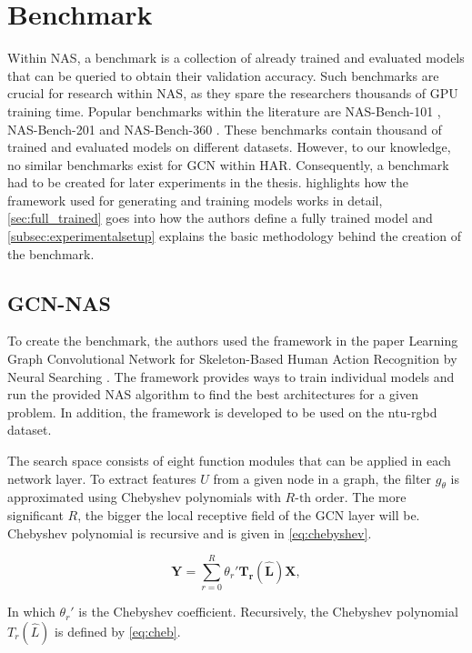 \section{Benchmark}
Within \gls{NAS}, a benchmark is a collection of already trained and evaluated models that can be queried to obtain their validation accuracy. Such benchmarks are crucial for research within \gls{NAS}, as they spare the researchers thousands of \gls{GPU} training time. Popular benchmarks within the literature are NAS-Bench-101 \autocite{ying2019bench}, NAS-Bench-201 \autocite{dong2020bench} and NAS-Bench-360 \autocite{tu2021bench}. These benchmarks contain thousand of trained and evaluated models on different datasets. However, to our knowledge, no similar benchmarks exist for \gls{GCN} within \gls{HAR}. Consequently, a benchmark had to be created for later experiments in the thesis.  highlights how the framework used for generating and training models works in detail, \cref{sec:full_trained} goes into how the authors define a fully trained model and \cref{subsec:experimentalsetup} explains the basic methodology behind the creation of the benchmark.       

\subsection{GCN-NAS}\label{sec:gcn-nas}
To create the benchmark, the authors used the framework in the paper Learning Graph Convolutional Network for Skeleton-Based Human Action Recognition by Neural Searching \autocite{peng2020learning}. The framework provides ways to train individual models and run the provided \gls{NAS} algorithm to find the best architectures for a given problem. In addition, the framework is developed to be used on the \gls{ntu-rgbd} dataset.  

The search space consists of eight function modules that can be applied in each network layer. To extract features $U$ from a given node in a graph, the filter $g_{\theta}$ is approximated using Chebyshev polynomials with $R\text{-th}$ order. The more significant $R$, the bigger the local receptive field of the \gls{GCN} layer will be. Chebyshev polynomial is recursive and is given in \cref{eq:chebyshev}. 

\begin{equation}
    \bm{Y} = \sum^R_{r=0} \theta_r' \bm{T_r} (\bm{\hat{L}})\bm{X},
    \label{eq:chebyshev}
\end{equation}

In which $ \theta_r'$ is the Chebyshev coefficient. Recursively, the Chebyshev polynomial $T_r(\hat{L})$ is defined by \cref{eq:cheb}. 


